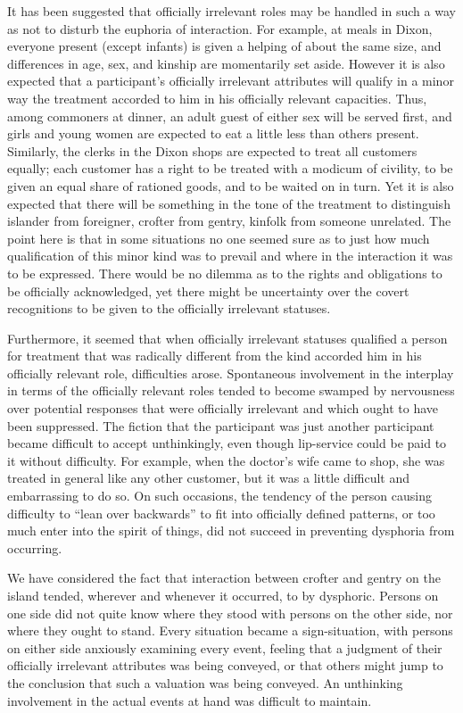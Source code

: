 \documentclass[openany,nobib]{tufte-book}
\begin{document}
It has been suggested that officially irrelevant roles may be handled in
such a way as not to disturb the euphoria of interaction. For example,
at meals in Dixon, everyone present (except infants) is given a helping
of about the same size, and differences in age, sex, and kinship are
momentarily set aside. However it is also expected that a participant's
officially irrelevant attributes will qualify in a minor way the
treatment accorded to him in his officially relevant capacities. Thus,
among commoners at dinner, an adult guest of either sex will be served
first, and girls and young women are expected to eat a little less than
others present. Similarly, the clerks in the Dixon shops are expected to
treat all customers equally; each customer has a right to be treated
with a modicum of civility, to be given an equal share of rationed
goods, and to be waited on in turn. Yet it is also expected that there
will be something in the tone of the treatment to distinguish islander
from foreigner, crofter from gentry, kinfolk from someone unrelated. The
point here is that in some situations no one seemed sure as to just how
much qualification of this minor kind was to prevail and where in the
interaction it was to be expressed. There would be no dilemma as to the
rights and obligations to be officially acknowledged, yet there might be
uncertainty over the covert recognitions to be given to the officially
irrelevant statuses.

Furthermore, it seemed that when officially irrelevant statuses
qualified a person for treatment that was radically different from the
kind accorded him in his officially relevant role, difficulties arose.
Spontaneous involvement in the interplay in terms of the officially
relevant roles tended to become swamped by nervousness over potential
responses that were officially irrelevant and which ought to have been
suppressed. The fiction that the participant was just another
participant became difficult to accept unthinkingly, even though
lip-service could be paid to it without difficulty. For example, when
the doctor's wife came to shop, she was treated in general like any
other customer, but it was a little difficult and embarrassing to do so.
On such occasions, the tendency of the person causing difficulty to
``lean over backwards'' to fit into officially defined patterns, or too
much enter into the spirit of things, did not succeed in preventing
dysphoria from occurring.

We have considered the fact that interaction between crofter and gentry
on the island tended, wherever and whenever it occurred, to by
dysphoric. Persons on one side did not quite know where they stood with
persons on the other side, nor where they ought to stand. Every
situation became a sign-situation, with persons on either side anxiously
examining every event, feeling that a judgment of their officially
irrelevant attributes was being conveyed, or that others might jump to
the conclusion that such a valuation was being conveyed. An unthinking
involvement in the actual events at hand was difficult to maintain.
\end{document}

